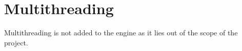 \section{Multithreading}
\label{sec:multithreading}
Multithreading is not added to the engine as it lies out of the scope of the project.